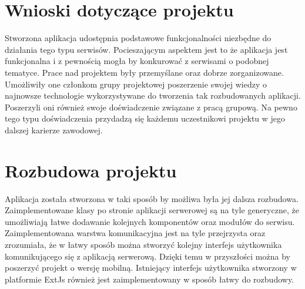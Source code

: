 \section{Wnioski dotyczące projektu}

Stworzona aplikacja udostępnia podstawowe funkcjonalności niezbędne do działania tego typu serwisów. Pocieszającym aspektem jest to że aplikacja jest funkcjonalna i z pewnością mogła by konkurować z serwisami o podobnej tematyce. 
Prace nad projektem były przemyślane oraz dobrze zorganizowane. Umożliwiły one członkom grupy projektowej poszerzenie swojej wiedzy o najnowsze technologie wykorzystywane do tworzenia tak rozbudowanych aplikacji. Poszerzyli oni również swoje doświadczenie związane z pracą grupową. 
Na pewno tego typu doświadczenia przydadzą się każdemu uczestnikowi projektu w jego dalszej karierze zawodowej.


\section{Rozbudowa projektu}

Aplikacja została stworzona w taki sposób by możliwa była jej dalsza rozbudowa. Zaimplementowane klasy po stronie aplikacji serwerowej są na tyle generyczne, że umożliwiają łatwe dodawanie kolejnych komponentów oraz modułów do serwisu. Zaimplementowana warstwa komunikacyjna jest na tyle przejrzysta oraz zrozumiała, że w łatwy sposób można stworzyć kolejny interfejs użytkownika komunikującego się z aplikacją serwerową. Dzięki temu w przyszłości można by poszerzyć projekt o wersję mobilną.
Istniejący interfejs użytkownika stworzony w platformie ExtJs również jest zaimplementowany w sposób łatwy do rozbudowy. 